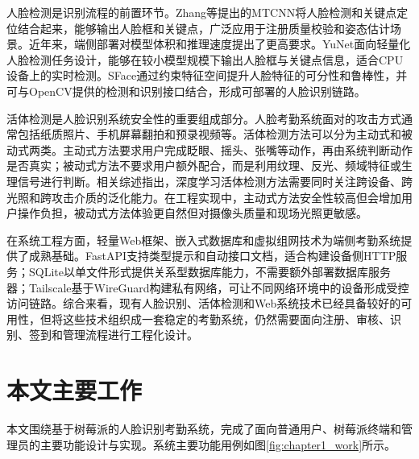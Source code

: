 人脸检测是识别流程的前置环节。Zhang等提出的MTCNN将人脸检测和关键点定位结合起来，能够输出人脸框和关键点，广泛应用于注册质量校验和姿态估计场景\cite{zhang2016mtcnn}。近年来，端侧部署对模型体积和推理速度提出了更高要求。YuNet面向轻量化人脸检测任务设计，能够在较小模型规模下输出人脸框与关键点信息，适合CPU设备上的实时检测\cite{wu2023yunet}。SFace通过约束特征空间提升人脸特征的可分性和鲁棒性\cite{zhong2021sface}，并可与OpenCV提供的检测和识别接口结合，形成可部署的人脸识别链路\cite{opencv_dnn_face}。

活体检测是人脸识别系统安全性的重要组成部分。人脸考勤系统面对的攻击方式通常包括纸质照片、手机屏幕翻拍和预录视频等。活体检测方法可以分为主动式和被动式两类。主动式方法要求用户完成眨眼、摇头、张嘴等动作，再由系统判断动作是否真实；被动式方法不要求用户额外配合，而是利用纹理、反光、频域特征或生理信号进行判断。相关综述指出，深度学习活体检测方法需要同时关注跨设备、跨光照和跨攻击介质的泛化能力\cite{yu2023fas}。在工程实现中，主动式方法安全性较高但会增加用户操作负担，被动式方法体验更自然但对摄像头质量和现场光照更敏感。

在系统工程方面，轻量Web框架、嵌入式数据库和虚拟组网技术为端侧考勤系统提供了成熟基础。FastAPI支持类型提示和自动接口文档，适合构建设备侧HTTP服务\cite{fastapi}；SQLite以单文件形式提供关系型数据库能力，不需要额外部署数据库服务器\cite{sqlite}；Tailscale基于WireGuard构建私有网络，可让不同网络环境中的设备形成受控访问链路\cite{tailscale}。综合来看，现有人脸识别、活体检测和Web系统技术已经具备较好的可用性，但将这些技术组织成一套稳定的考勤系统，仍然需要面向注册、审核、识别、签到和管理流程进行工程化设计。

\section{本文主要工作}

本文围绕基于树莓派的人脸识别考勤系统，完成了面向普通用户、树莓派终端和管理员的主要功能设计与实现。系统主要功能用例如图\ref{fig:chapter1_work}所示。

